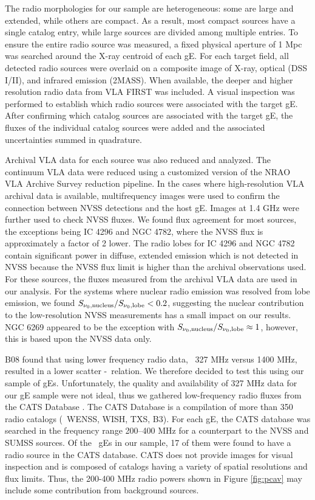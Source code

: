 \documentclass[12pt, preprint]{aastex}
\begin{document}
The radio morphologies for our sample are heterogeneous: some are
large and extended, while others are compact. As a result, most
compact sources have a single catalog entry, while large sources are
divided among multiple entries. To ensure the entire radio source was
measured, a fixed physical aperture of 1 Mpc was searched around the
X-ray centroid of each gE. For each target field, all detected radio
sources were overlaid on a composite image of X-ray, optical (DSS
I/II), and infrared emission (2MASS). When available, the deeper and
higher resolution radio data from VLA FIRST was included. A visual
inspection was performed to establish which radio sources were
associated with the target gE. After confirming which catalog sources
are associated with the target gE, the fluxes of the individual
catalog sources were added and the associated uncertainties summed in
quadrature.

Archival VLA data for each source was also reduced and analyzed. The
continuum VLA data were reduced using a customized version of the NRAO
VLA Archive Survey reduction pipeline. In the cases where
high-resolution VLA archival data is available, multifrequency images
were used to confirm the connection between NVSS detections and the
host gE. Images at 1.4 GHz were further used to check NVSS fluxes. We
found flux agreement for most sources, the exceptions being IC 4296
and NGC 4782, where the NVSS flux is approximately a factor of 2
lower. The radio lobes for IC 4296 and NGC 4782 contain significant
power in diffuse, extended emission which is not detected in NVSS
because the NVSS flux limit is higher than the archival observations
used. For these sources, the fluxes measured from the archival VLA
data are used in our analysis. For the systems where nuclear radio
emission was resolved from lobe emission, we found
$S_{\nu_0,\rm{nucleus}} / S_{\nu_0,\rm{lobe}} < 0.2$, suggesting the
nuclear contribution to the low-resolution NVSS measurements has a
small impact on our results. NGC 6269 appeared to be the exception
with $S_{\nu_0,\rm{nucleus}} / S_{\nu_0,\rm{lobe}} \approx 1$,
however, this is based upon the NVSS data only.

B08 found that using lower frequency radio data, \ie\ 327 MHz versus
1400 MHz, resulted in a lower scatter \pjet-\prad\ relation. We
therefore decided to test this using our sample of gEs. Unfortunately,
the quality and availability of 327 MHz data for our gE sample were
not ideal, thus we gathered low-frequency radio fluxes from the CATS
Database \citep{cats}. The CATS Database is a compilation of more than
350 radio catalogs (\eg\ WENSS, WISH, TXS, B3). For each gE, the CATS
database was searched in the frequency range 200--400 MHz for a
counterpart to the NVSS and SUMSS sources. Of the \samp\ gEs in our
sample, 17 of them were found to have a radio source in the CATS
database. CATS does not provide images for visual inspection and is
composed of catalogs having a variety of spatial resolutions and flux
limits. Thus, the 200-400 MHz radio powers shown in Figure
\ref{fig:pcav} may include some contribution from background sources.
\end{document}
